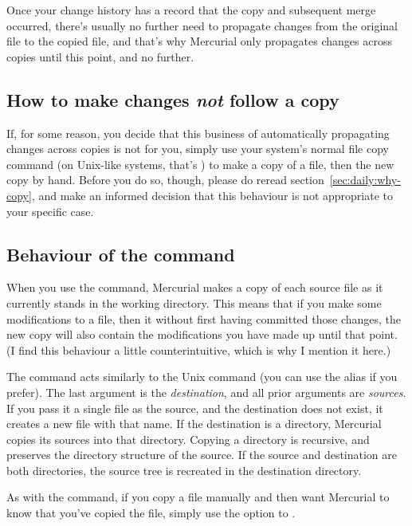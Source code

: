 Once your change history has a record that the copy and subsequent
merge occurred, there's usually no further need to propagate changes
from the original file to the copied file, and that's why Mercurial
only propagates changes across copies until this point, and no
further.

\subsection{How to make changes \emph{not} follow a copy}

If, for some reason, you decide that this business of automatically
propagating changes across copies is not for you, simply use your
system's normal file copy command (on Unix-like systems, that's
) to make a copy of a file, then  the new copy
by hand.  Before you do so, though, please do reread
section~\ref{sec:daily:why-copy}, and make an informed decision that
this behaviour is not appropriate to your specific case.

\subsection{Behaviour of the  command}

When you use the  command, Mercurial makes a copy of each
source file as it currently stands in the working directory.  This
means that if you make some modifications to a file, then 
it without first having committed those changes, the new copy will
also contain the modifications you have made up until that point.  (I
find this behaviour a little counterintuitive, which is why I mention
it here.)

The  command acts similarly to the Unix 
command (you can use the  alias if you prefer).  The last
argument is the \emph{destination}, and all prior arguments are
\emph{sources}.  If you pass it a single file as the source, and the
destination does not exist, it creates a new file with that name.
If the destination is a directory, Mercurial copies its sources into
that directory.
Copying a directory is recursive, and preserves the directory
structure of the source.
If the source and destination are both directories, the source tree is
recreated in the destination directory.

As with the  command, if you copy a file manually and
then want Mercurial to know that you've copied the file, simply use
the  option to .

